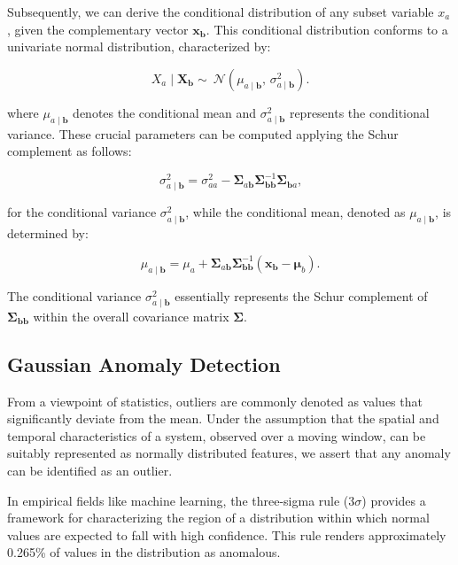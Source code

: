 Subsequently, we can derive the conditional distribution of any subset variable $x_a$, given the complementary vector $\boldsymbol{x_b}$. This conditional distribution conforms to a univariate normal distribution, characterized by:

\begin{equation}
  X_a \mid \mathbf{X}_{\boldsymbol{b}} \sim\ \mathcal{N}(\mu_{a \mid \boldsymbol{b}},\, \sigma_{a \mid \boldsymbol{b}}^2)\text{.}\label{eq:cond_distribution}
\end{equation}

where $\mu_{a \mid \boldsymbol{b}}$ denotes the conditional mean and $\sigma_{a \mid \boldsymbol{b}}^2$ represents the conditional variance. These crucial parameters can be computed applying the Schur complement as follows:

\begin{equation}
  \sigma_{a \mid \boldsymbol{b}}^2 = \sigma_{aa}^2 - \boldsymbol\Sigma_{a\boldsymbol{b}} \boldsymbol\Sigma_{\boldsymbol{bb}}^{-1} \boldsymbol\Sigma_{\boldsymbol{b}a}\text{,}\label{eq:cond_var}
\end{equation}

for the conditional variance $\sigma_{a \mid \boldsymbol{b}}^2$, while the conditional mean, denoted as $\mu_{a \mid \boldsymbol{b}}$, is determined by:

\begin{equation}
  \mu_{a \mid \boldsymbol{b}} = \mu_a + \boldsymbol\Sigma_{a\boldsymbol{b}} \boldsymbol\Sigma_{\boldsymbol{bb}}^{-1} (\boldsymbol{x_b} - \boldsymbol\mu_b)\text{.}\label{eq:cond_mean}
\end{equation}

The conditional variance $\sigma_{a \mid \boldsymbol{b}}^2$ essentially represents the Schur complement of $\boldsymbol\Sigma_{\boldsymbol{bb}}$ within the overall covariance matrix $\boldsymbol\Sigma$.

\subsection{Gaussian Anomaly Detection}\label{AA:Anomaly}
From a viewpoint of statistics, outliers are commonly denoted as values that significantly deviate from the mean. Under the assumption that the spatial and temporal characteristics of a system, observed over a moving window, can be suitably represented as normally distributed features, we assert that any anomaly can be identified as an outlier.

In empirical fields like machine learning, the three-sigma rule ($3\sigma$) provides a framework for characterizing the region of a distribution within which normal values are expected to fall with high confidence. This rule renders approximately 0.265\% of values in the distribution as anomalous.

